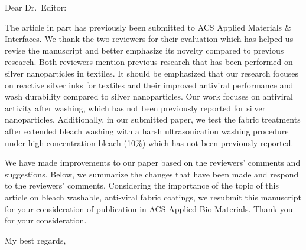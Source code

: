 \documentclass[12pt]{letter}
\date{\today}
\begin{document}
\begin{letter}{}

\opening{Dear Dr.~Editor:}


The article in part has previously been submitted to ACS Applied Materials & Interfaces. We thank the two reviewers for their evaluation which has helped us revise the manuscript and better emphasize its novelty compared to previous research.  Both reviewers mention previous research that has been performed on  silver nanoparticles in textiles.  It should be emphasized that our research focuses on reactive silver inks for textiles and their improved antiviral performance and wash durability compared to silver nanoparticles.
Our work focuses on antiviral activity after washing, which has not been previously reported for silver nanoparticles.  
Additionally, in our submitted paper, we test the fabric treatments after extended bleach washing with a harsh ultrasonication washing procedure under high concentration bleach (10\%) which has not been previously reported. 



We have made improvements to our paper based on the reviewers' comments and suggestions.
Below, we summarize the changes that have been made and respond to the reviewers' comments.
Considering the importance of the topic of this
article on 
bleach washable, anti-viral fabric coatings,
we resubmit this manuscript for your consideration of publication in ACS Applied Bio Materials.
Thank you for your consideration.

\closing{My best regards,}




\end{letter}




\end{document}

